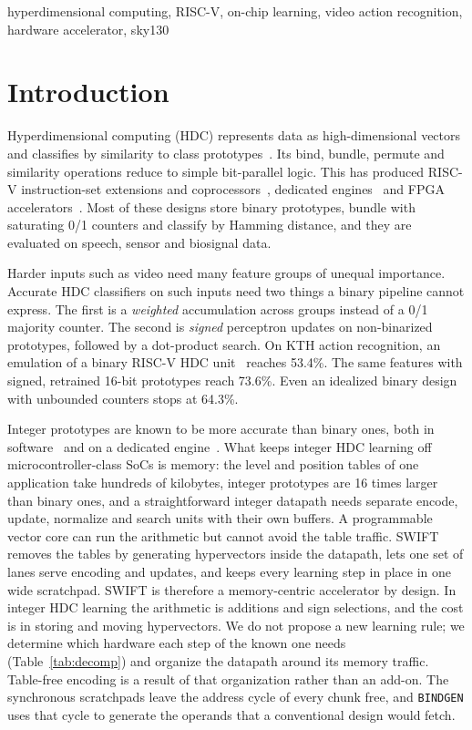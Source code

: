 \documentclass[conference]{IEEEtran}
\begin{document}
\begin{IEEEkeywords}
hyperdimensional computing, RISC-V, on-chip learning, video action recognition, hardware accelerator, sky130
\end{IEEEkeywords}

\section{Introduction}
Hyperdimensional computing (HDC) represents data as high-dimensional vectors and classifies by similarity to class prototypes~\cite{kanerva2009}. Its bind, bundle, permute and similarity operations reduce to simple bit-parallel logic. This has produced RISC-V instruction-set extensions and coprocessors~\cite{martino2026,montagna2018}, dedicated engines~\cite{tinyhd,generic} and FPGA accelerators~\cite{li2024eeg,sahruri2026routehd}. Most of these designs store binary prototypes, bundle with saturating 0/1 counters and classify by Hamming distance, and they are evaluated on speech, sensor and biosignal data.

Harder inputs such as video need many feature groups of unequal importance. Accurate HDC classifiers on such inputs need two things a binary pipeline cannot express. The first is a \emph{weighted} accumulation across groups instead of a 0/1 majority counter. The second is \emph{signed} perceptron updates on non-binarized prototypes, followed by a dot-product search. On KTH action recognition, an emulation of a binary RISC-V HDC unit~\cite{martino2026} reaches 53.4\%. The same features with signed, retrained 16-bit prototypes reach 73.6\%. Even an idealized binary design with unbounded counters stops at 64.3\%.

Integer prototypes are known to be more accurate than binary ones, both in software~\cite{onlinehd} and on a dedicated engine~\cite{generic}. What keeps integer HDC learning off microcontroller-class SoCs is memory: the level and position tables of one application take hundreds of kilobytes, integer prototypes are 16 times larger than binary ones, and a straightforward integer datapath needs separate encode, update, normalize and search units with their own buffers. A programmable vector core can run the arithmetic but cannot avoid the table traffic. SWIFT removes the tables by generating hypervectors inside the datapath, lets one set of lanes serve encoding and updates, and keeps every learning step in place in one wide scratchpad.
SWIFT is therefore a memory-centric accelerator by design. In integer HDC learning the arithmetic is additions and sign selections, and the cost is in storing and moving hypervectors. We do not propose a new learning rule; we determine which hardware each step of the known one needs (Table~\ref{tab:decomp}) and organize the datapath around its memory traffic. Table-free encoding is a result of that organization rather than an add-on. The synchronous scratchpads leave the address cycle of every chunk free, and \texttt{BINDGEN} uses that cycle to generate the operands that a conventional design would fetch.
\end{document}
